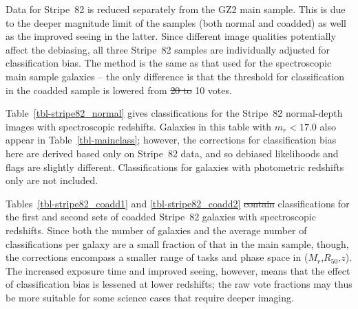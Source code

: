 \documentclass[useAMS,usenatbib]{mn2e}
\newcommand{\mr}{$M_r$}
\newcommand{\rfifty}{$R_{50}$}
\newcommand{\redshift}{$z$}
\providecommand{\DIFaddtex}[1]{{\protect\color{blue}\uwave{#1}}} %
\providecommand{\DIFdeltex}[1]{{\protect\color{red}\sout{#1}}}                      %
\providecommand{\DIFaddbegin}{} %
\providecommand{\DIFaddend}{} %
\providecommand{\DIFdelbegin}{} %
\providecommand{\DIFdelend}{} %
\providecommand{\DIFadd}[1]{\texorpdfstring{\DIFaddtex{#1}}{#1}} %
\providecommand{\DIFdel}[1]{\texorpdfstring{\DIFdeltex{#1}}{}} %
\begin{document}
Data for Stripe~82 is reduced separately from the GZ2 main sample. This is due to the deeper magnitude limit of the samples (both normal and coadded) as well as the improved seeing in the latter. Since different image qualities potentially affect the debiasing, all three Stripe~82 samples are individually adjusted for classification bias. The method is the same as that used for the spectroscopic main sample galaxies -- the only difference is that the threshold for classification in the coadded sample is lowered from \DIFdelbegin \DIFdel{20 to }\DIFdelend 10 \DIFaddbegin \DIFadd{to 20 }\DIFaddend votes. 

Table~\ref{tbl-stripe82_normal} gives classifications for the Stripe~82 normal-depth images with spectroscopic redshifts. Galaxies in this table with $m_r < 17.0$ also appear in Table~\ref{tbl-mainclass}; however, the corrections for classification bias here are derived based only on Stripe~82 data, and so debiased likelihoods and flags are slightly different. Classifications for galaxies with photometric redshifts only are not included.

Tables~\ref{tbl-stripe82_coadd1} and \ref{tbl-stripe82_coadd2} \DIFdelbegin \DIFdel{contain }\DIFdelend \DIFaddbegin \DIFadd{contains }\DIFaddend classifications for the first and second sets of coadded Stripe~82 galaxies with spectroscopic redshifts. Since both the number of galaxies and the average number of classifications per galaxy are a small fraction of that in the main sample, though, the corrections encompass a smaller range of tasks and phase space in (\mr,\rfifty,\redshift). The increased exposure time and improved seeing, however, means that the effect of classification bias is lessened at lower redshifts; the raw vote fractions may thus be more suitable for some science cases that require deeper imaging. 
\end{document}
